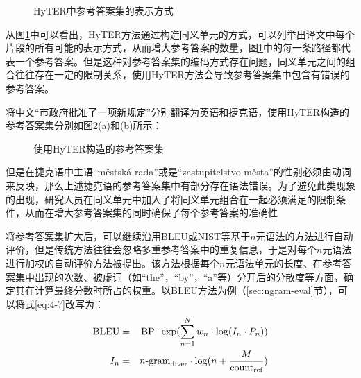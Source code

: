 \begin{figure}[htp]
    \centering
	
   \caption{HyTER中参考答案集的表示方式}
   \label{fig:4-7}
\end{figure}

\parinterval 从图\ref{fig:4-7}中可以看出，HyTER方法通过构造同义单元的方式，可以列举出译文中每个片段的所有可能的表示方式，从而增大参考答案的数量，图\ref{fig:4-7}中的每一条路径都代表一个参考答案。但是这种对参考答案集的编码方式存在问题，同义单元之间的组合往往存在一定的限制关系，使用HyTER方法会导致参考答案集中包含有错误的参考答案。

\begin{example}
将中文“市政府批准了一项新规定”分别翻译为英语和捷克语，使用HyTER构造的参考答案集分别如图\ref{fig:4-8}(a)和(b)所示：
\label{eg:4-6}
\end{example}

\begin{figure}[htp]
    \centering
{}
   \caption{使用HyTER构造的参考答案集}
   \label{fig:4-8}
\end{figure}

\parinterval 但是在捷克语中主语“městská rada”或是“zastupitelstvo města”的性别必须由动词来反映，那么上述捷克语的参考答案集中有部分存在语法错误。为了避免此类现象的出现，研究人员在同义单元中加入了将同义单元组合在一起必须满足的限制条件，从而在增大参考答案集的同时确保了每个参考答案的准确性

\parinterval 将参考答案集扩大后，可以继续沿用BLEU或NIST等基于$n$元语法的方法进行自动评价，但是传统方法往往会忽略多重参考答案中的重复信息，于是对每个$n$元语法进行加权的自动评价方法被提出。该方法根据每个$n$元语法单元的长度、在参考答案集中出现的次数、被虚词（如“the”，“by”，“a”等）分开后的分散度等方面，确定其在计算最终分数时所占的权重。以BLEU方法为例（\ref{sec:ngram-eval}节），可以将式\eqref{eq:4-7}改写为：
\begin{eqnarray}
\textrm{BLEU} &=& \textrm {BP} \cdot {\textrm{exp}}(\sum\limits_{n = 1}^N {{w_n} \cdot \log ({I}_n \cdot {P}_n} ))
\label{eq:4-14}\\
{I}_n &=& n\textrm{-gram}_{\textrm {diver}} \cdot \log (n + \frac{M}{\textrm{count}_{\textrm{ref}}})
\label{eq:4-15}
\end{eqnarray}

